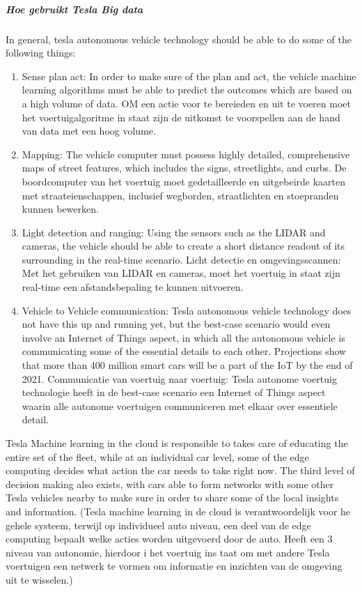 \documentclass{article}
\begin{document}
\subparagraph{Hoe gebruikt Tesla Big data}
In general, tesla autonomous vehicle technology should be able to do some of the following things:
\begin{enumerate}
\item  Sense plan act: In order to make sure of the plan and act, the vehicle machine learning algorithms must be able to predict the outcomes which are based on a high volume of data.
OM een actie voor te bereieden en uit te voeren moet het voertuigalgoritme in staat zijn de uitkomst te voorspellen aan de hand van data met een hoog volume.
\item  Mapping: The vehicle computer must possess highly detailed, comprehensive maps of street features, which includes the signs, streetlights, and curbs.
De boordcomputer van het voertuig moet gedetailleerde en uitgebeirde kaarten met straateienschappen, inclusief wegborden, straatlichten en stoepranden kunnen bewerken.
\item  Light detection and ranging: Using the sensors such as the LIDAR and cameras, the vehicle should be able to create a short distance readout of its surrounding in the real-time scenario.
Licht detectie en  omgevingsscannen: Met het gebruiken van LIDAR en cameras, moet het voertuig in staat zijn real-time een afstandsbepaling te kunnen uitvoeren.
\item Vehicle to Vehicle communication: Tesla autonomous vehicle technology does not have this up and running yet, but the best-case scenario would even involve an Internet of Things aspect, in which all the autonomous vehicle is communicating some of the essential details to each other. Projections show that more than 400 million smart cars will be a part of the IoT by the end of 2021. Communicatie van voertuig naar voertuig: Tesla autonome voertuig technologie heeft in de best-case scenario een Internet of Things aspect waarin alle autonome voertuigen communiceren met elkaar over essentiele detail.
\end{enumerate}

Tesla Machine learning in the cloud is responsible to takes care of educating the entire set of the fleet, while at an individual car level, some of the edge computing decides what action the car needs to take right now. The third level of decision making also exists, with cars able to form networks with some other Tesla vehicles nearby to make sure in order to share some of the local insights and information. (Tesla machine learning in de cloud is verantwoordelijk voor he gehele systeem, terwijl op individueel auto niveau, een deel van de edge computing bepaalt welke acties worden uitgevoerd door de auto. Heeft een 3 niveau van autonomie,  hierdoor i het voertuig ins taat om met andere Tesla voertuigen een netwerk te vormen om informatie en inzichten van de omgeving uit te wisselen.)
\end{document}
